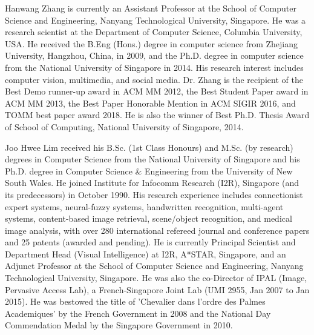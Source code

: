 \documentclass[lettersize,journal]{IEEEtran}
\begin{document}
\begin{IEEEbiography}{Hanwang Zhang} is currently an Assistant Professor at the School of Computer Science and Engineering, Nanyang Technological University, Singapore. He was a research scientist at the Department of Computer Science, Columbia University, USA. He received the B.Eng (Hons.) degree in computer science from Zhejiang University, Hangzhou, China, in 2009, and the Ph.D. degree in computer science from the National University of Singapore in 2014. His research interest includes computer vision, multimedia, and social media. Dr. Zhang is the recipient of the Best Demo runner-up award in ACM MM 2012, the Best Student Paper award in ACM MM 2013, the Best Paper Honorable Mention in ACM SIGIR 2016, and TOMM best paper award 2018. He is also the winner of Best Ph.D. Thesis Award of School of Computing, National University of Singapore, 2014.
\end{IEEEbiography}

\begin{IEEEbiography}{Joo Hwee Lim} received his B.Sc. (1st Class Honours) and M.Sc. (by research) degrees in Computer Science from the National University of Singapore and his Ph.D. degree in Computer Science \& Engineering from the University of New South Wales. He joined Institute for Infocomm Research (I2R), Singapore (and its predecessors) in October 1990. His research experience includes connectionist expert systems, neural-fuzzy systems, handwritten recognition, multi-agent systems, content-based image retrieval, scene/object recognition, and medical image analysis, with over 280 international refereed journal and conference papers and 25 patents (awarded and pending).
He is currently Principal Scientist and Department Head (Visual Intelligence) at I2R, A*STAR, Singapore, and an Adjunct Professor at the School of Computer Science and Engineering, Nanyang Technological University, Singapore. He was also the co-Director of IPAL (Image, Pervasive Access Lab), a French-Singapore Joint Lab (UMI 2955, Jan 2007 to Jan 2015). He was bestowed the title of 'Chevalier dans l'ordre des Palmes Academiques' by the French Government in 2008 and the National Day Commendation Medal by the Singapore Government in 2010.
\end{IEEEbiography}
\end{document}

